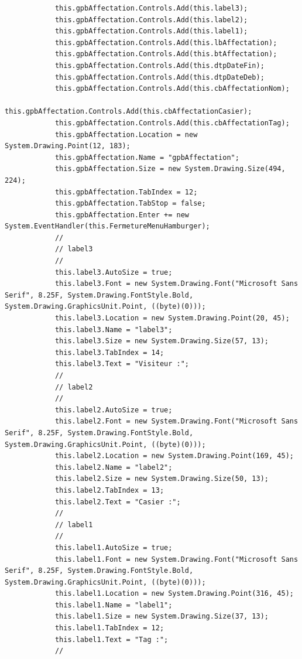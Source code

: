 \documentclass[main.tex]{subfiles}
\begin{document}
\begin{lstlisting}
            this.gpbAffectation.Controls.Add(this.label3);
            this.gpbAffectation.Controls.Add(this.label2);
            this.gpbAffectation.Controls.Add(this.label1);
            this.gpbAffectation.Controls.Add(this.lbAffectation);
            this.gpbAffectation.Controls.Add(this.btAffectation);
            this.gpbAffectation.Controls.Add(this.dtpDateFin);
            this.gpbAffectation.Controls.Add(this.dtpDateDeb);
            this.gpbAffectation.Controls.Add(this.cbAffectationNom);
            this.gpbAffectation.Controls.Add(this.cbAffectationCasier);
            this.gpbAffectation.Controls.Add(this.cbAffectationTag);
            this.gpbAffectation.Location = new System.Drawing.Point(12, 183);
            this.gpbAffectation.Name = "gpbAffectation";
            this.gpbAffectation.Size = new System.Drawing.Size(494, 224);
            this.gpbAffectation.TabIndex = 12;
            this.gpbAffectation.TabStop = false;
            this.gpbAffectation.Enter += new System.EventHandler(this.FermetureMenuHamburger);
            // 
            // label3
            // 
            this.label3.AutoSize = true;
            this.label3.Font = new System.Drawing.Font("Microsoft Sans Serif", 8.25F, System.Drawing.FontStyle.Bold, System.Drawing.GraphicsUnit.Point, ((byte)(0)));
            this.label3.Location = new System.Drawing.Point(20, 45);
            this.label3.Name = "label3";
            this.label3.Size = new System.Drawing.Size(57, 13);
            this.label3.TabIndex = 14;
            this.label3.Text = "Visiteur :";
            // 
            // label2
            // 
            this.label2.AutoSize = true;
            this.label2.Font = new System.Drawing.Font("Microsoft Sans Serif", 8.25F, System.Drawing.FontStyle.Bold, System.Drawing.GraphicsUnit.Point, ((byte)(0)));
            this.label2.Location = new System.Drawing.Point(169, 45);
            this.label2.Name = "label2";
            this.label2.Size = new System.Drawing.Size(50, 13);
            this.label2.TabIndex = 13;
            this.label2.Text = "Casier :";
            // 
            // label1
            // 
            this.label1.AutoSize = true;
            this.label1.Font = new System.Drawing.Font("Microsoft Sans Serif", 8.25F, System.Drawing.FontStyle.Bold, System.Drawing.GraphicsUnit.Point, ((byte)(0)));
            this.label1.Location = new System.Drawing.Point(316, 45);
            this.label1.Name = "label1";
            this.label1.Size = new System.Drawing.Size(37, 13);
            this.label1.TabIndex = 12;
            this.label1.Text = "Tag :";
            // 

\end{lstlisting}
\end{document}
